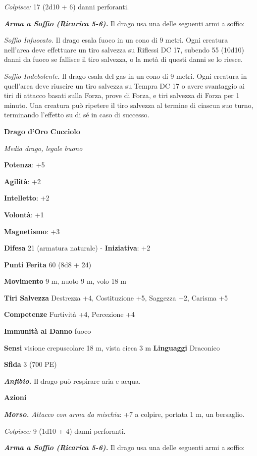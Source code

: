 \begin{multicols}{2}
\emph{Colpisce:} 17 (2d10 + 6) danni perforanti.

\emph{\textbf{Arma a Soffio (Ricarica 5-6).}} Il drago usa una delle
seguenti armi a soffio:

\emph{Soffio Infuocato.} Il drago esala fuoco in un cono di 9 metri.
Ogni creatura nell'area deve effettuare un tiro salvezza su Riflessi DC
17, subendo 55 (10d10) danni da fuoco se fallisce il tiro salvezza, o la
metà di questi danni se lo riesce.

\emph{Soffio Indebolente.} Il drago esala del gas in un cono di 9 metri.
Ogni creatura in quell'area deve riuscire un tiro salvezza su Tempra DC
17 o avere svantaggio ai tiri di attacco basati sulla Forza, prove di
Forza, e tiri salvezza di Forza per 1 minuto. Una creatura può ripetere
il tiro salvezza al termine di ciascun suo turno, terminando l'effetto
su di sé in caso di successo.

\textbf{Drago d'Oro Cucciolo}

\emph{Media drago, legale buono}

\textbf{Potenza}: +5

\textbf{Agilità}: +2

\textbf{Intelletto}: +2

\textbf{Volontà}: +1

\textbf{Magnetismo}: +3

\textbf{Difesa} 21 (armatura naturale) - \textbf{Iniziativa}: +2

\textbf{Punti Ferita} 60 (8d8 + 24)

\textbf{Movimento} 9 m, nuoto 9 m, volo 18 m

\textbf{Tiri Salvezza} Destrezza +4, Costituzione +5, Saggezza +2,
Carisma +5

\textbf{Competenze} Furtività +4, Percezione +4

\textbf{Immunità al Danno} fuoco

\textbf{Sensi} visione crepuscolare 18 m, vista cieca 3 m
\textbf{Linguaggi} Draconico

\textbf{Sfida} 3 (700 PE)\smallskip

\emph{\textbf{Anfibio.}} Il drago può respirare aria e acqua.

\smallskip\textbf{Azioni}

\emph{\textbf{Morso.} Attacco con arma da mischia}: +7 a colpire,
portata 1 m, un bersaglio.

\emph{Colpisce:} 9 (1d10 + 4) danni perforanti.

\emph{\textbf{Arma a Soffio (Ricarica 5-6).}} Il drago usa una delle
seguenti armi a soffio:


\end{multicols}
